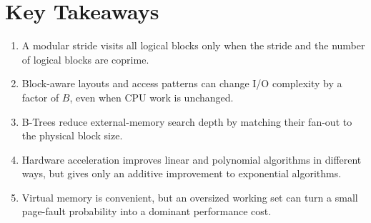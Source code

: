 \section{Key Takeaways}
\label{sec:lecture-two-takeaways}

\begin{enumerate}
  \item A modular stride visits all logical blocks only when the stride and the
    number of logical blocks are coprime.
  \item Block-aware layouts and access patterns can change I/O complexity by a
    factor of $B$, even when CPU work is unchanged.
  \item B-Trees reduce external-memory search depth by matching their fan-out
    to the physical block size.
  \item Hardware acceleration improves linear and polynomial algorithms in
    different ways, but gives only an additive improvement to exponential
    algorithms.
  \item Virtual memory is convenient, but an oversized working set can turn a
    small page-fault probability into a dominant performance cost.
\end{enumerate}
